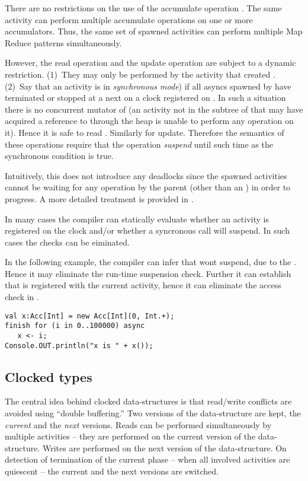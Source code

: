 There are no restrictions on the use of the accumulate operation
. The same activity can perform multiple accumulate
operations on one or more accumulators. Thus, the same set of spawned
activities can perform multiple Map Reduce patterns simultaneously.

However, the read operation  and the update operation
 are subject to a dynamic restriction. (1)~They may only
be performed by the activity that created . (2)~Say that an
activity  is in {\em synchronous mode}) if all asyncs spawned
by  have terminated or stopped at a next on a clock registered
on .  In such a situation there is no concurrent mutator of
 (an activity not in the subtree of  that may have
acquired a reference to  through the heap is unable to perform
any operation on it). Hence it is safe to read . Similarly for
update. Therefore the semantics of these operations require that the
operation {\em suspend} until such time as the synchronous condition
is true. 

Intuitively, this does not introduce any deadlocks since the
spawned activities cannot be waiting for any operation by the parent
(other than an ) in order to progress. A more detailed
treatment is provided in .


In many cases the compiler can statically evaluate whether an activity
is registered on the clock and/or whether a syncronous call will
suspend. In such cases the checks can be eiminated.
\begin{example}
In the following example, the compiler can infer that  wont suspend, due to
the . Hence it may eliminate the run-time suspension
check. Further it can establish that  is 
registered with the current activity, hence it can eliminate the
access check in .
\begin{lstlisting}
val x:Acc[Int] = new Acc[Int](0, Int.+);
finish for (i in 0..100000) async
   x <- i;
Console.OUT.println("x is " + x());
\end{lstlisting}
  
\end{example}

\subsection{Clocked types}

The central idea behind clocked data-structures is that read/write
conflicts are avoided using ``double buffering.'' Two versions of the
data-structure are kept, the {\em current} and the {\em next}
versions. Reads can be performed simultaneously by multiple activities
-- they are performed on the current version of the
data-structure. Writes are performed on the next version of the
data-structure. On detection of termination of the current phase --
when all involved activities are quiescent -- the current and the next
versions are switched.

